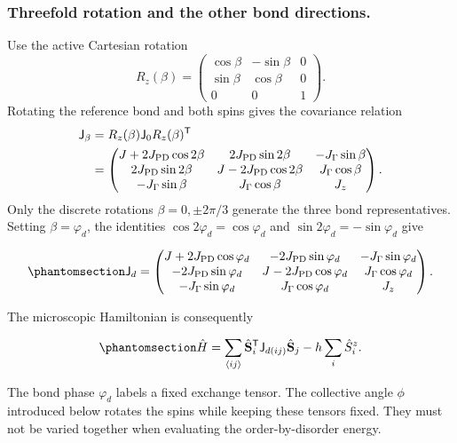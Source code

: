 \subsubsection*{Threefold rotation and the other bond directions.}
Use the active Cartesian rotation
\begin{equation*}
R_z(\beta)=\begin{pmatrix}
\cos\beta&-\sin\beta&0\\
\sin\beta&\cos\beta&0\\0&0&1
\end{pmatrix}.
\end{equation*}
Rotating the reference bond and both spins gives the covariance relation
\begin{align*}
\mathsf J_\beta&=R_z(\beta)\mathsf J_0R_z(\beta)^{\mathsf T}\\
&=\begin{pmatrix}
J+2J_{\rm PD}\cos2\beta&2J_{\rm PD}\sin2\beta&-J_\Gamma\sin\beta\\
2J_{\rm PD}\sin2\beta&J-2J_{\rm PD}\cos2\beta&J_\Gamma\cos\beta\\
-J_\Gamma\sin\beta&J_\Gamma\cos\beta&J_z
\end{pmatrix}.
\end{align*}
Only the discrete rotations \(\beta=0,\pm2\pi/3\) generate the three
bond representatives. Setting \(\beta=\varphi_d\), the identities
\(\cos2\varphi_d=\cos\varphi_d\) and
\(\sin2\varphi_d=-\sin\varphi_d\) give

\begin{equation}\phantomsection\label{eq-nbcp-bond-matrix}{
\mathsf J_d=
\begin{pmatrix}
J+2J_{\rm PD}\cos\varphi_d&-2J_{\rm PD}\sin\varphi_d&-J_\Gamma\sin\varphi_d\\
-2J_{\rm PD}\sin\varphi_d&J-2J_{\rm PD}\cos\varphi_d&J_\Gamma\cos\varphi_d\\
-J_\Gamma\sin\varphi_d&J_\Gamma\cos\varphi_d&J_z
\end{pmatrix}.
}\end{equation}

The microscopic Hamiltonian is consequently

\begin{equation}\phantomsection\label{eq-nbcp-model}{
\hat H=\sum_{\langle ij\rangle}\hat{\mathbf S}_i^{\mathsf T}
\mathsf J_{d(ij)}\hat{\mathbf S}_j-h\sum_i\hat S_i^z.
}\end{equation}

The bond phase \(\varphi_d\) labels a fixed exchange tensor. The
collective angle \(\phi\) introduced below rotates the spins while
keeping these tensors fixed. They must not be varied together when
evaluating the order-by-disorder energy.

